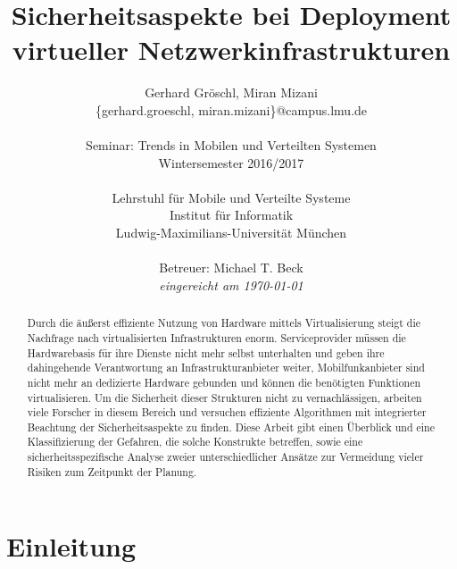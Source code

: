 \documentclass{lni}
\author{Gerhard Gröschl, Miran Mizani\\\{gerhard.groeschl, miran.mizani\}@campus.lmu.de\\\\
Seminar: Trends in Mobilen und Verteilten Systemen \\Wintersemester 2016/2017\\\\
Lehrstuhl für Mobile und Verteilte Systeme\\Institut für Informatik\\Ludwig-Maximilians-Universität München\\\\
Betreuer: Michael T. Beck\\\textit{eingereicht am \today}}
\title{Sicherheitsaspekte bei Deployment virtueller Netzwerkinfrastrukturen}
\begin{document}
\maketitle

\vfill

\begin{abstract}
Durch die äußerst effiziente Nutzung von Hardware mittels Virtualisierung steigt die Nachfrage nach virtualisierten Infrastrukturen enorm. Serviceprovider müssen die Hardwarebasis für ihre Dienste nicht mehr selbst unterhalten und geben ihre dahingehende Verantwortung an Infrastrukturanbieter weiter, Mobilfunkanbieter sind nicht mehr an dedizierte Hardware gebunden und können die benötigten Funktionen virtualisieren. Um die Sicherheit dieser Strukturen nicht zu vernachlässigen, arbeiten viele Forscher in diesem Bereich und versuchen effiziente Algorithmen mit integrierter Beachtung der Sicherheitsaspekte zu finden. Diese Arbeit gibt einen Überblick und eine Klassifizierung der Gefahren, die solche Konstrukte betreffen, sowie eine sicherheitsspezifische Analyse zweier unterschiedlicher Ansätze zur Vermeidung vieler Risiken zum Zeitpunkt der Planung.
\end{abstract}


\newpage
\tableofcontents
\newpage

\section{Einleitung}
\label{sec:Einleitung}





\end{document}
